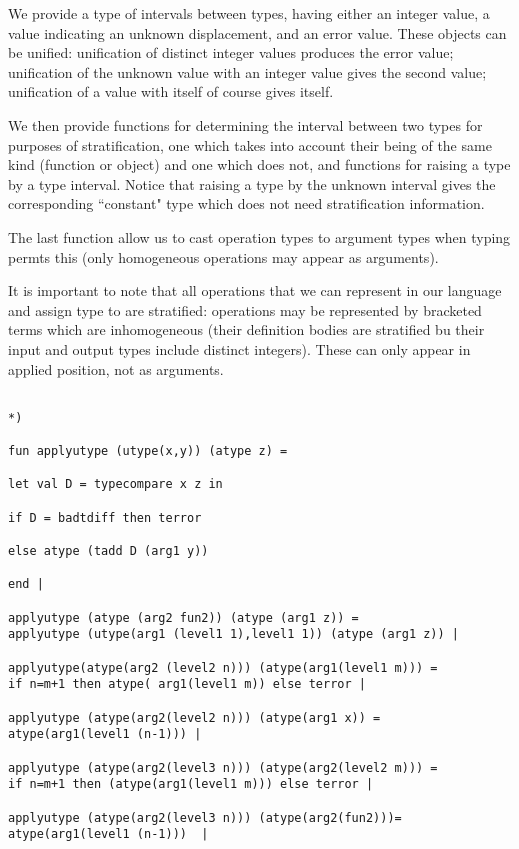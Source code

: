 \documentclass{article}
\begin{document}
{{We provide a type of intervals between types, having either an integer value, a value indicating an unknown displacement, and an error value.  These objects can be unified:  unification of distinct
integer values produces the error value;  unification of the unknown value with an integer value gives the second value;  unification of a value with itself of course gives itself.

We then provide functions for determining the interval between two types for purposes of stratification, one which takes into account their being of the same kind (function or object) and one which does not,
and functions for raising a type by a type interval.  Notice that raising a type by the unknown interval gives the corresponding ``constant" type which does not need stratification information.

The last function allow us to cast operation types to argument types when typing permts this (only homogeneous operations may appear as arguments).

It is important to note that all operations that we can represent in our language and assign type to are stratified:  operations may be represented by bracketed terms which are inhomogeneous (their definition bodies
are stratified bu their input and output types include distinct integers).  These can only appear in applied position, not as arguments.

\begin{verbatim}

*)

fun applyutype (utype(x,y)) (atype z) =

let val D = typecompare x z in 

if D = badtdiff then terror

else atype (tadd D (arg1 y))

end |

applyutype (atype (arg2 fun2)) (atype (arg1 z)) =
applyutype (utype(arg1 (level1 1),level1 1)) (atype (arg1 z)) |

applyutype(atype(arg2 (level2 n))) (atype(arg1(level1 m))) =
if n=m+1 then atype( arg1(level1 m)) else terror |

applyutype (atype(arg2(level2 n))) (atype(arg1 x)) =
atype(arg1(level1 (n-1))) |

applyutype (atype(arg2(level3 n))) (atype(arg2(level2 m))) =
if n=m+1 then (atype(arg1(level1 m))) else terror |

applyutype (atype(arg2(level3 n))) (atype(arg2(fun2)))=
atype(arg1(level1 (n-1)))  |


\end{verbatim}}}
\end{document}
